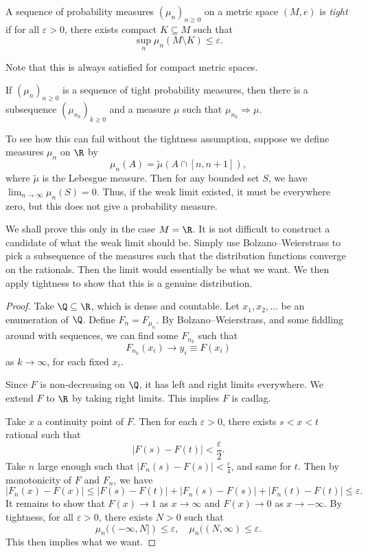 \documentclass[a4paper]{article}
\begin{document}
\begin{defi}
  A sequence of probability measures $(\mu_n)_{n \geq 0}$ on a metric space $(M, e)$ is \emph{tight} if for all $\varepsilon > 0$, there exists compact $K \subseteq M$ such that
  \[
    \sup_n \mu_n (M \setminus K) \leq \varepsilon.
  \]
\end{defi}
Note that this is always satisfied for compact metric spaces.

\begin{thm}
  If $(\mu_n)_{n \geq 0}$ is a sequence of tight probability measures, then there is a subsequence $(\mu_{n_k})_{k \geq 0}$ and a measure $\mu$ such that $\mu_{n_k} \Rightarrow \mu$.
\end{thm}

To see how this can fail without the tightness assumption, suppose we define measures $\mu_n$ on $\R$ by
\[
  \mu_n(A) = \tilde{\mu}(A \cap [n, n + 1]),
\]
where $\tilde{\mu}$ is the Lebesgue measure. Then for any bounded set $S$, we have $\lim_{n \to \infty} \mu_n(S) = 0$. Thus, if the weak limit existed, it must be everywhere zero, but this does not give a probability measure.

We shall prove this only in the case $M = \R$. It is not difficult to construct a candidate of what the weak limit should be. Simply use Bolzano--Weierstrass to pick a subsequence of the measures such that the distribution functions converge on the rationals. Then the limit would essentially be what we want. We then apply tightness to show that this is a genuine distribution.

\begin{proof}
  Take $\Q\subseteq \R$, which is dense and countable. Let $x_1, x_2, \ldots$ be an enumeration of $\Q$. Define $F_n = F_{\mu_n}$. By Bolzano--Weierstrass, and some fiddling around with sequences, we can find some $F_{n_k}$ such that
  \[
    F_{n_k}(x_i) \to y_i \equiv F(x_i)
  \]
  as $k \to \infty$, for each fixed $x_i$.

  Since $F$ is non-decreasing on $\Q$, it has left and right limits everywhere. We extend $F$ to $\R$ by taking right limits. This implies $F$ is cadlag.

  Take $x$ a continuity point of $F$. Then for each $\varepsilon > 0$, there exists $s < x < t$ rational such that
  \[
    |F(s) - F(t)| < \frac{\varepsilon}{2}.
  \]
  Take $n$ large enough such that $|F_n(s) - F(s)| < \frac{\varepsilon}{4}$, and same for $t$. Then by monotonicity of $F$ and $F_n$, we have
  \[
    |F_n(x) - F(x)| \leq |F(s) - F(t)| + |F_n(s) - F(s) | + |F_n(t) - F(t)| \leq \varepsilon.
  \]
  It remains to show that $F(x) \to 1$ as $x \to \infty$ and $F(x) \to 0$ as $x \to -\infty$. By tightness, for all $\varepsilon > 0$, there exists $N > 0$ such that
  \[
    \mu_n((-\infty, N]) \leq \varepsilon,\quad \mu_n((N, \infty) \leq \varepsilon.
  \]
  This then implies what we want.
\end{proof}
\end{document}
